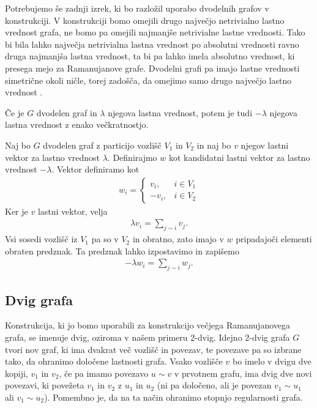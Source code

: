 Potrebujemo še zadnji izrek, ki bo razložil uporabo dvodelnih grafov v konstrukciji. V konstrukciji bomo omejili drugo največjo netrivialno lastno vrednost grafa, ne bomo pa omejili najmanjše netrivialne lastne vrednosti. Tako bi bila lahko največja netrivialna lastna vrednost po absolutni vrednosti ravno druga najmanjša lastna vrednost, ta bi pa lahko imela absolutno vrednost, ki presega mejo za Ramanujanove grafe. Dvodelni grafi pa imajo lastne vrednosti simetrične okoli ničle, torej zadošča, da omejimo samo drugo največjo lastno vrednost \cite{godsil}.

\begin{izrek}
    Če je \(G\) dvodelen graf in \(\lambda\) njegova lastna vrednost, potem je tudi \(-\lambda\) njegova lastna vrednost z enako večkratnostjo.
\end{izrek}
\begin{dokaz}
    Naj bo \(G\) dvodelen graf z particijo vozlišč \(V_1\) in \(V_2\) in naj bo \(v\) njegov lastni vektor za lastno vrednost \(\lambda\). Definirajmo \(w\) kot kandidatni lastni vektor za lastno vrednost \(-\lambda\). Vektor definiramo kot
    \begin{align*}
        w_i = \begin{cases}
                  v_i,  & i\in V_1 \\
                  -v_i, & i\in V_2
              \end{cases}
    \end{align*}
    Ker je \(v\) lastni vektor, velja
    \begin{align*}
        \lambda v_i = \sum_{j\sim i} v_j.
    \end{align*}
    Vsi sosedi vozlišč iz \(V_1\) pa so v \(V_2\) in obratno, zato imajo v \(w\) pripadajoči elementi obraten predznak. Ta predznak lahko izpostavimo in zapišemo
    \begin{align*}
        -\lambda w_i = \sum_{j\sim i} w_j.
    \end{align*}
\end{dokaz}

\subsection{Dvig grafa}
Konstrukcija, ki jo bomo uporabili za konstrukcijo večjega Ramanujanovega grafa, se imenuje dvig, oziroma v našem primeru 2-dvig. Idejno 2-dvig grafa \(G\) tvori nov graf, ki ima dvakrat več vozlišč in povezav, te povezave pa so izbrane tako, da ohranimo določene lastnosti grafa. Vsako vozlišče \(v\) bo imelo v dvigu dve kopiji, \(v_1\) in \(v_2\), če pa imamo povezavo \(u\sim v\) v prvotnem grafu, ima dvig dve novi povezavi, ki povežeta \(v_1\) in \(v_2\) z \(u_1\) in \(u_2\) (ni pa določeno, ali je povezan \(v_1\sim u_1\) ali \(v_1\sim u_2\)). Pomembno je, da na ta način ohranimo stopnjo regularnosti grafa.

